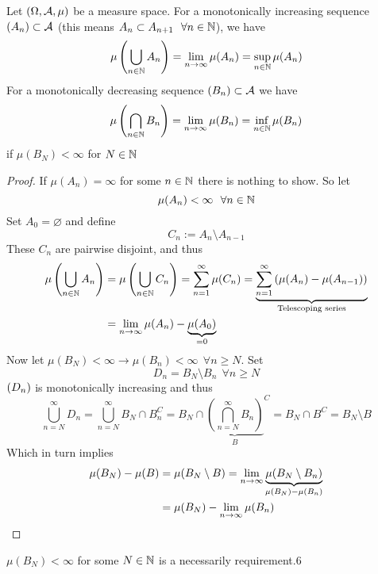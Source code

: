 \documentclass[../../script.tex]{subfiles}
\begin{document}
\begin{thm}
    Let $\measure$ be a measure space. For a monotonically increasing sequence $\anyseqdef[A]{\setfam}$ (this means $A_n \subset A_{n+1} ~~\forall n \in \natn$), we have
    \[
        \mu\left(\bigcup_{n \in \natn} A_n\right) = \limn \mu(A_n) = \sup_{n \in \natn} \mu(A_n) 
    \]
    For a monotonically decreasing sequence $\anyseqdef[B]{\setfam}$ we have 
    \[
        \mu\left(\bigcap_{n \in \natn} B_n\right) = \limn \mu(B_n) = \inf_{n \in \natn} \mu(B_n)
    \]
    if $\mu(B_N) < \infty$ for $N \in \natn$
\end{thm}
\begin{proof}
    If $\mu(A_n) = \infty$ for some $n \in \natn$ there is nothing to show. So let 
    \begin{equation}
        \mu(A_n) < \infty ~~\forall n \in \natn
    \end{equation}
    Set $A_0 = \varnothing$ and define 
    \begin{equation}
        C_n := A_n \setminus A_{n-1}
    \end{equation}
    These $C_n$ are pairwise disjoint, and thus 
    \begin{equation}
        \begin{split}
            \mu\left( \bigcup_{n \in \natn} A_n \right) &= \mu\left( \bigcup_{n \in \natn} C_n \right) = \sum_{n=1}^{\infty} \mu(C_n) = \underbrace{\sum_{n=1}^{\infty}\left( \mu(A_n) - \mu(A_{n-1}) \right)}_{\text{Telescoping series}} \\
            &= \limn \mu(A_n) - \underbrace{\mu(A_0)}_{= 0}
        \end{split}
    \end{equation}
    Now let $\mu(B_N) < \infty \rightarrow \mu(B_n) < \infty ~~\forall n \ge N$. Set 
    \begin{equation}
        D_n = B_N \setminus B_n ~~\forall n \ge N
    \end{equation}
    $\seq{D}$ is monotonically increasing and thus 
    \begin{equation}
        \bigcup_{n = N}^{\infty} D_n = \bigcup_{n = N}^{\infty} B_N \cap B_n^C = B_N \cap {\underbrace{\left( \bigcap_{n = N}^{\infty} B_n \right)}_B}^C = B_N \cap B^C = B_N \setminus B
    \end{equation}
    Which in turn implies 
    \begin{equation}
        \begin{split}
            \mu(B_N) - \mu(B) &= \mu(B_N \setminus B) = \limn \underbrace{\mu(B_N \setminus B_n)}_{\mu(B_N) - \mu(B_n)} \\
            &= \mu(B_N) - \limn \mu(B_n)
        \end{split}
    \end{equation}
\end{proof}

\begin{rem}
    $\mu(B_N) < \infty$ for some $N \in \natn$ is a necessarily requirement.6
\end{rem}
\end{document}
